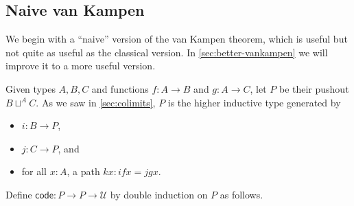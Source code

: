 \documentclass[10pt,a4paper]{article}
\newcommand{\UU}{\ensuremath{\mathcal{U}}\xspace}
\let\type\UU
\newcommand{\code}{\ensuremath{\mathsf{code}}\xspace}
\theoremstyle{definition}
\theoremstyle{remark}
\numberwithin{equation}{section}
\begin{document}
\subsection{Naive van Kampen}
\label{sec:naive-vankampen}

We begin with a ``naive'' version of the van Kampen theorem, which is useful but not quite as useful as the classical version.
In \cref{sec:better-vankampen} we will improve it to a more useful version.

Given types $A,B,C$ and functions $f:A\to B$ and $g:A\to C$, let $P$ be their pushout $B\sqcup^A C$.
As we saw in \cref{sec:colimits}, $P$ is the higher inductive type generated by
\begin{itemize}
\item $i:B\to P$,
\item $j:C\to P$, and
\item for all $x:A$, a path $k x:ifx = jgx$.
\end{itemize}
Define $\code:P\to P\to \type$ by double induction on $P$ as follows.
\end{document}
